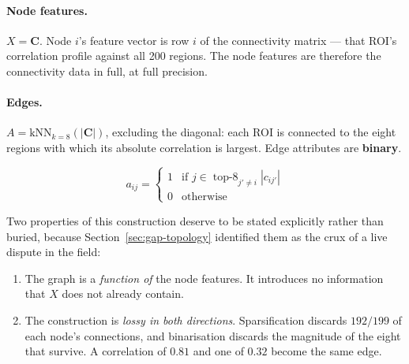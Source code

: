 \paragraph{Node features.} $X = \mathbf{C}$. Node $i$'s feature vector is row $i$ of the
connectivity matrix --- that ROI's correlation profile against all 200 regions. The node
features are therefore the connectivity data in full, at full precision.

\paragraph{Edges.} $A = \mathrm{kNN}_{k=8}\!\left(|\mathbf{C}|\right)$, excluding the
diagonal: each ROI is connected to the eight regions with which its absolute correlation is
largest. Edge attributes are \textbf{binary}.

\[
  a_{ij} = \begin{cases}
    1 & \text{if } j \in \operatorname{top-8}_{j' \ne i} \left| c_{ij'} \right| \\
    0 & \text{otherwise}
  \end{cases}
\]

Two properties of this construction deserve to be stated explicitly rather than buried,
because Section~\ref{sec:gap-topology} identified them as the crux of a live dispute in the
field:

\begin{enumerate}
  \item The graph is a \emph{function of} the node features. It introduces no information
    that $X$ does not already contain.
  \item The construction is \emph{lossy in both directions}. Sparsification discards
    $192/199$ of each node's connections, and binarisation discards the magnitude of the
    eight that survive. A correlation of $0.81$ and one of $0.32$ become the same edge.
\end{enumerate}


